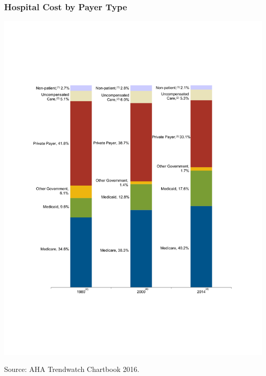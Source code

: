 \documentclass[ucs,9pt]{beamer}
\begin{document}
\begin{frame}
\frametitle{Hospital Cost by Payer Type}
\begin{center}
\includegraphics[scale=0.35]{4_5}
\end{center}
\tiny Source: AHA Trendwatch Chartbook 2016.  
\end{frame}
\end{document}
